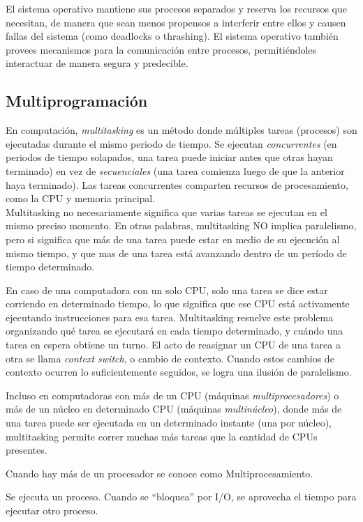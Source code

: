 \documentclass[a4paper, twoside]{article}
\begin{document}
El sistema operativo mantiene sus procesos separados y reserva los recursos que
necesitan, de manera que sean menos propensos a interferir entre ellos y causen
fallas del sistema (como deadlocks o thrashing).
El sistema operativo también provees mecanismos para la comunicación entre
procesos, permitiéndoles interactuar de manera segura y predecible.

\subsection{Multiprogramación}

En computación, \emph{multitasking} es un método donde múltiples tareas
(procesos) son ejecutadas durante el mismo periodo de tiempo.
Se ejecutan \emph{concurrentes} (en periodos de tiempo solapados, una tarea
puede iniciar antes que otras hayan terminado) en vez de \emph{secuenciales}
(una tarea comienza luego de que la anterior haya terminado).
Las tareas concurrentes comparten recursos de procesamiento, como la CPU y
memoria principal.\\

Multitasking no necesariamente significa que varias tareas se ejecutan en el
mismo preciso momento.
En otras palabras, multitasking NO implica paralelismo, pero si significa que
más de una tarea puede estar en medio de su ejecución al mismo tiempo, y que
mas de una tarea está avanzando dentro de un período de tiempo determinado.

En caso de una computadora con un solo CPU, solo una tarea se dice estar
corriendo en determinado tiempo, lo que significa que ese CPU está activamente
ejecutando instrucciones para esa tarea.
Multitasking resuelve este problema organizando qué tarea se ejecutará en cada
tiempo determinado, y cuándo una tarea en espera obtiene un turno.
El acto de reasignar un CPU de una tarea a otra se llama \emph{context switch},
o cambio de contexto.
Cuando estos cambios de contexto ocurren lo suficientemente seguidos,
se logra una ilusión de paralelismo.

Incluso en computadoras con más de un CPU (máquinas \emph{multiprocesadores}) o
más de un núcleo en determinado CPU (máquinas \emph{multinúcleo}),
donde más de una tarea puede ser ejecutada en un determinado instante
(una por núcleo), multitasking permite correr muchas más tareas que la cantidad
de CPUs presentes.

Cuando hay más de un procesador se conoce como Multiprocesamiento.

Se ejecuta un proceso. Cuando se ``bloquea'' por I/O, se aprovecha el tiempo
para ejecutar otro proceso.
\end{document}
